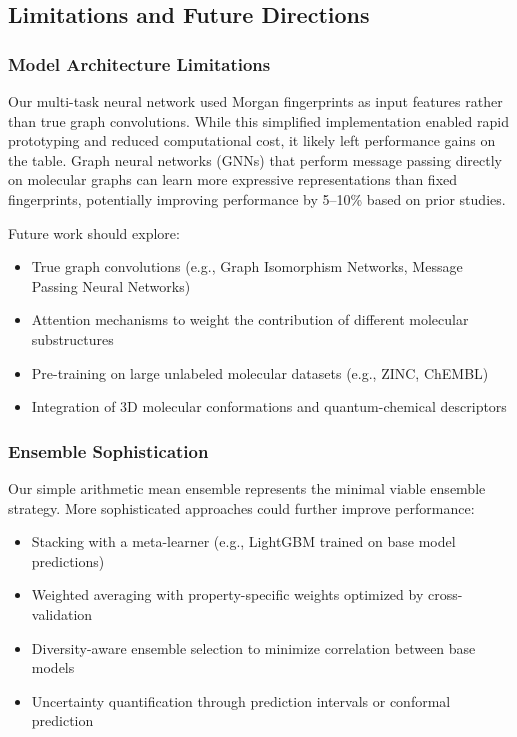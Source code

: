 \documentclass[11pt,a4paper]{article}
\begin{document}
\subsection{Limitations and Future Directions}

\subsubsection{Model Architecture Limitations}

Our multi-task neural network used Morgan fingerprints as input features rather than true graph convolutions. While this simplified implementation enabled rapid prototyping and reduced computational cost, it likely left performance gains on the table. Graph neural networks (GNNs) that perform message passing directly on molecular graphs can learn more expressive representations than fixed fingerprints, potentially improving performance by 5--10\% based on prior studies.

Future work should explore:
\begin{itemize}
    \item True graph convolutions (e.g., Graph Isomorphism Networks, Message Passing Neural Networks)
    \item Attention mechanisms to weight the contribution of different molecular substructures
    \item Pre-training on large unlabeled molecular datasets (e.g., ZINC, ChEMBL)
    \item Integration of 3D molecular conformations and quantum-chemical descriptors
\end{itemize}

\subsubsection{Ensemble Sophistication}

Our simple arithmetic mean ensemble represents the minimal viable ensemble strategy. More sophisticated approaches could further improve performance:
\begin{itemize}
    \item Stacking with a meta-learner (e.g., LightGBM trained on base model predictions)
    \item Weighted averaging with property-specific weights optimized by cross-validation
    \item Diversity-aware ensemble selection to minimize correlation between base models
    \item Uncertainty quantification through prediction intervals or conformal prediction
\end{itemize}
\end{document}
